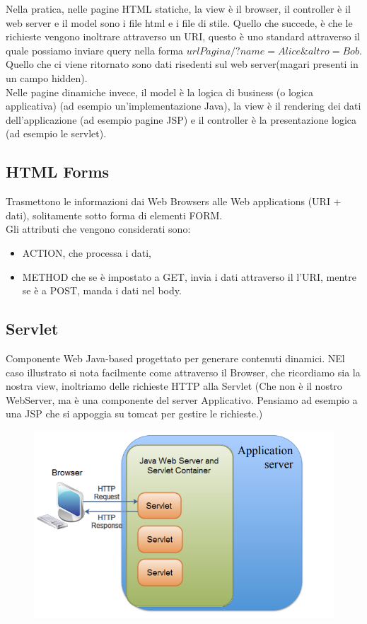 Nella pratica, nelle pagine HTML statiche, la view è il browser, il controller è il web server e il model sono i file html e i file di stile. Quello che succede, è che le richieste vengono inoltrare attraverso un URI, questo è uno standard attraverso il quale possiamo inviare query nella forma $urlPagina/?name=Alice\&altro=Bob$. Quello che ci viene ritornato sono dati risedenti sul web server(magari presenti in un campo hidden). \\

Nelle pagine dinamiche invece, il model è la logica di business (o logica applicativa) (ad esempio un’implementazione Java), la view è il rendering dei dati dell’applicazione (ad esempio pagine JSP) e il controller è la presentazione logica (ad esempio le servlet).

\subsection{HTML Forms}
Trasmettono le informazioni dai Web Browsers alle Web applications (URI + dati), solitamente sotto forma di elementi FORM.\\ Gli attributi che vengono considerati sono:
\begin{itemize}
   \item ACTION, che processa i dati, 
   \item METHOD che se è impostato a GET, invia i dati attraverso il l’URI, mentre se è a POST, manda i dati nel body.
   
\end{itemize}
\subsection{Servlet}
Componente Web Java-based progettato per generare contenuti dinamici. NEl caso illustrato si nota facilmente come attraverso il Browser, che ricordiamo sia la nostra view, inoltriamo delle richieste HTTP alla Servlet (Che non è il nostro WebServer, ma è una componente del server Applicativo. Pensiamo ad esempio a una JSP che si appoggia su tomcat per gestire le richieste.)
\begin{figure}[H]
    \centering
    \includegraphics[scale=0.6]{Imm/jsp-servlet.PNG}
\end{figure}

